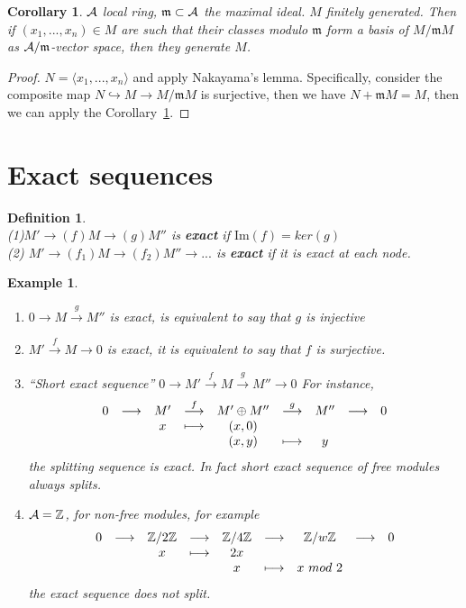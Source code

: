\documentclass[11pt]{article}
\newtheorem{cor}[thm]{Corollary}
\newtheorem{dfn}[thm]{Definition}
\newtheorem{ex}[thm]{Example}
\newcommand{\intg}{\mathbb Z}
\newcommand{\scm}{{\mathfrak m}}
\newcommand{\cala}{{\cal A}}
\newcommand{\rta}{\rightarrow}
\newcommand{\lrta}{\longrightarrow}
\newcommand{\lgl}{\langle}
\newcommand{\rgl}{\rangle}
\newcommand{\inj}{\hookrightarrow}
\begin{document}
\begin{cor}\label{cor:Nakayama}
$\cala$ local ring, $\scm\subset \cala$ the maximal ideal. $M$ finitely generated. Then if $(x_1,...,x_n)\in M$ are such that their classes modulo $\scm$ form a basis of $M/\scm M$ as $\cala/\scm$-vector space, then they generate $M$.
\end{cor}

\begin{proof}
$N=\lgl x_1,...,x_n\rgl$ and apply Nakayama's lemma. Specifically, consider the composite map $N\inj M\lrta M/\scm M$ is surjective, then we have $N+\scm M=M$, then we can apply the Corollary~\ref{cor:Nakayama}.
\end{proof}
\section*{Exact sequences}
\begin{dfn}\ \\
(1)$M'\rta(f) M\rta(g) M''$ is \textbf{exact} if $\text{Im}(f)=ker(g)$\\
(2) $M'\rta(f_1) M\rta(f_2) M''\rta...$ is \textbf{exact} if it is exact at each node.
\end{dfn}

\begin{ex}\ 
\begin{enumerate}
\item $0\lrta M\overset{g}{\lrta} M''$ is exact, is equivalent to say that $g$ is injective
\item $M'\overset{f}{\lrta}M\lrta 0$ is exact, it is equivalent to say that $f$ is surjective.
\item ``Short exact sequence'' $0\lrta M'\overset{f}{\lrta}M\overset{g}{\lrta}M'' \lrta0$ For instance, 
$$
\begin{array}{ c c c c c c c c c}
0 & \longrightarrow  & M' & \overset{f}{\longrightarrow } & M'\oplus M'' & \overset{g}{\longrightarrow } & M'' & \longrightarrow  & 0\\
 &  & x &\longmapsto  & (x,0) &  &  &  & \\
 &  &  &  & (x,y) & \longmapsto & y &  &
\end{array}
$$
 the splitting sequence is exact. In fact short exact sequence of free modules always splits.
 \item $\cala=\intg$, for non-free modules, for example
 $$
\begin{array}{ c c c c c c c c c}
0 & \longrightarrow  & \intg/2\intg & \longrightarrow  & \intg/4\intg & \longrightarrow  & \intg/w\intg & \longrightarrow  & 0\\
 &  & x &\longmapsto  & 2x &  &  &  & \\
 &  &  &  & x & \longmapsto & x\  mod\ 2 &  &
\end{array}
$$
the exact sequence does not split.
\end{enumerate}
\end{ex}
\end{document}
